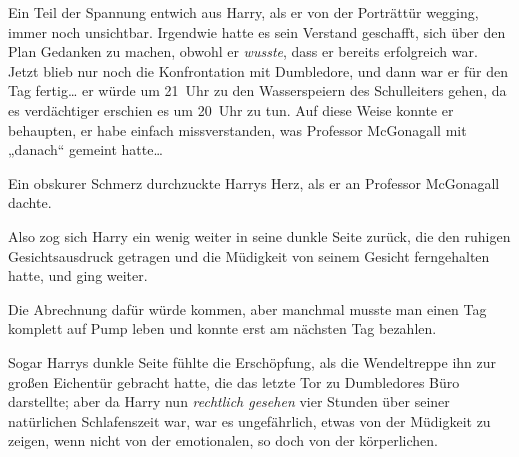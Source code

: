 Ein Teil der Spannung entwich aus Harry, als er von der Porträttür wegging, immer noch unsichtbar. Irgendwie hatte es sein Verstand geschafft, sich über den Plan Gedanken zu machen, obwohl er \emph{wusste}, dass er bereits erfolgreich war. Jetzt blieb nur noch die Konfrontation mit Dumbledore, und dann war er für den Tag fertig… er würde um 21~Uhr zu den Wasserspeiern des Schulleiters gehen, da es verdächtiger erschien es um 20~Uhr zu tun. Auf diese Weise konnte er behaupten, er habe einfach missverstanden, was Professor McGonagall mit „danach“ gemeint hatte…

Ein obskurer Schmerz durchzuckte Harrys Herz, als er an Professor McGonagall dachte.

Also zog sich Harry ein wenig weiter in seine dunkle Seite zurück, die den ruhigen Gesichtsausdruck getragen und die Müdigkeit von seinem Gesicht ferngehalten hatte, und ging weiter.

Die Abrechnung dafür würde kommen, aber manchmal musste man einen Tag komplett auf Pump leben und konnte erst am nächsten Tag bezahlen.

\later

Sogar Harrys dunkle Seite fühlte die Erschöpfung, als die Wendeltreppe ihn zur großen Eichentür gebracht hatte, die das letzte Tor zu Dumbledores Büro darstellte; aber da Harry nun \emph{rechtlich gesehen} vier Stunden über seiner natürlichen Schlafenszeit war, war es ungefährlich, etwas von der Müdigkeit zu zeigen, wenn nicht von der emotionalen, so doch von der körperlichen.

